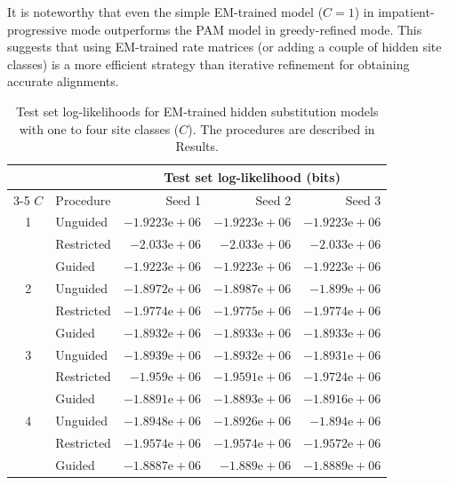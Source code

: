\documentclass[12pt]{article}
\begin{document}
It is noteworthy that even the simple EM-trained model ($C = 1$) in impatient-progressive mode
outperforms the PAM model in greedy-refined mode. This suggests that using EM-trained rate matrices
(or adding a couple of hidden site classes) is a more efficient strategy than iterative refinement
for obtaining accurate alignments.


\begin{table}[t]
\centering
\caption{Test set log-likelihoods for EM-trained hidden substitution models with one to four site classes ($C$). The procedures are described in Results.}
\label{tab:loglik}
\begin{tabular}{clrrr}
\toprule
& & \multicolumn{3}{c}{Test set log-likelihood (bits)} \\
\cmidrule(l){3-5}
$C$ & Procedure & Seed 1 & Seed 2 & Seed 3 \\
\midrule
1 & Unguided   & $-1.9223\mathrm{e}{+}06$ & $-1.9223\mathrm{e}{+}06$ & $-1.9223\mathrm{e}{+}06$ \\
  & Restricted & $-2.033\mathrm{e}{+}06$  & $-2.033\mathrm{e}{+}06$  & $-2.033\mathrm{e}{+}06$ \\
  & Guided     & $-1.9223\mathrm{e}{+}06$ & $-1.9223\mathrm{e}{+}06$ & $-1.9223\mathrm{e}{+}06$ \\
\midrule
2 & Unguided   & $-1.8972\mathrm{e}{+}06$ & $-1.8987\mathrm{e}{+}06$ & $-1.899\mathrm{e}{+}06$ \\
  & Restricted & $-1.9774\mathrm{e}{+}06$ & $-1.9775\mathrm{e}{+}06$ & $-1.9774\mathrm{e}{+}06$ \\
  & Guided     & $-1.8932\mathrm{e}{+}06$ & $-1.8933\mathrm{e}{+}06$ & $-1.8933\mathrm{e}{+}06$ \\
\midrule
3 & Unguided   & $-1.8939\mathrm{e}{+}06$ & $-1.8932\mathrm{e}{+}06$ & $-1.8931\mathrm{e}{+}06$ \\
  & Restricted & $-1.959\mathrm{e}{+}06$  & $-1.9591\mathrm{e}{+}06$ & $-1.9724\mathrm{e}{+}06$ \\
  & Guided     & $-1.8891\mathrm{e}{+}06$ & $-1.8893\mathrm{e}{+}06$ & $-1.8916\mathrm{e}{+}06$ \\
\midrule
4 & Unguided   & $-1.8948\mathrm{e}{+}06$ & $-1.8926\mathrm{e}{+}06$ & $-1.894\mathrm{e}{+}06$ \\
  & Restricted & $-1.9574\mathrm{e}{+}06$ & $-1.9574\mathrm{e}{+}06$ & $-1.9572\mathrm{e}{+}06$ \\
  & Guided     & $-1.8887\mathrm{e}{+}06$ & $-1.889\mathrm{e}{+}06$  & $-1.8889\mathrm{e}{+}06$ \\
\bottomrule
\end{tabular}
\end{table}
\end{document}
